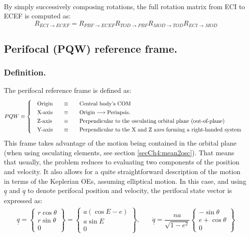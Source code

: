 		\paragraph{ \\}
		\indent By simply successively composing rotations, the full rotation matrix from ECI to ECEF is computed as:
		\[
		R_{ECI\rightarrow ECEF} = R_{PBF \rightarrow ECEF} R_{TOD \rightarrow PBF} R_{MOD\rightarrow TOD} R_{ECI\rightarrow MOD}		
		\]
	\subsection{Perifocal (PQW) reference frame.} \label{sec: PQW}
		\subsubsection{Definition.}
		\indent The perifocal reference frame is defined as:
		\[
		\arraycolsep=10pt
		\def\arraystretch{1.3}
		PQW\equiv\left\{
		\begin{array}{lll}
		\text{Origin} 	& \equiv 	& \text{Central body's COM} \\
		\text{X-axis} 	& \equiv 	& \text{Origin} \longrightarrow \text{Periapsis.} \\
		\text{Z-axis} 	& \equiv 	& \text{Perpendicular to the osculating orbital plane (out-of-plane)} \\
		\text{Y-axis} 	& \equiv 	& \text{Perpendicular to the X and Z axes forming a right-handed system} \\
		\end{array}
		\right.
		\]
		\indent This frame takes advantage of the motion being contained in the orbital plane (when using osculating elements, see section \ref{secCh4:mean2osc}). That means that usually, the problem reduces to evaluating two components of the position and velocity. It also allows for a quite straightforward description of the motion in terms of the Keplerian OEs, assuming elliptical motion. In this case, and using $\underline{q}$ and $\underline{\dot{q}}$ to denote perifocal position and velocity, the perifocal state vector is expressed as:
		\[\begin{array}{cc}
		\underline{q} = \left\{ 
		\begin{array}{c}
		r \cos \theta \\
		r \sin \theta \\
		0
		\end{array}				
		\right\} = 
		\left\{ 
		\begin{array}{c}
		a \left( \cos E - e \right) \\
		a \sin E\\
		0
		\end{array}				
		\right\},  		& \quad
		\underline{\dot{q}} = \dfrac{na}{\sqrt{1-e^2}}
		\left\{ 
		\begin{array}{c}
		-\sin\theta\\
		e + \cos \theta\\
		0
		\end{array}				
		\right\}		
		\end{array}
		\]
